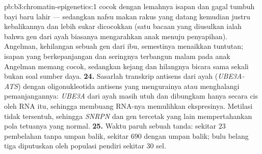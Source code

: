 \begin{solution}{pb:b3:chromatin-epigenetics:1}
cocok dengan lemahnya isapan dan gagal tumbuh bayi baru lahir --- sedangkan
nafsu makan rakus yang datang kemudian justru kebalikannya dan lebih sukar
dicocokkan (satu bacaan yang diusulkan ialah bahwa gen dari ayah biasanya
mengarahkan anak menuju penyapihan). Angelman, kehilangan sebuah gen dari
ibu, semestinya menaikkan tuntutan; isapan yang berkepanjangan dan seringnya
terbangun malam pada anak Angelman memang cocok, sedangkan kejang dan
hilangnya bicara sama sekali bukan soal sumber daya.
\textbf{24.} Sasarlah transkrip antisens dari ayah
(\emph{UBE3A-ATS}) dengan oligonukleotida antisens yang mengurainya
atau menghalangi pemanjangannya: \emph{UBE3A} dari ayah masih utuh dan
dibungkam hanya secara cis oleh RNA itu, sehingga membuang RNA-nya memulihkan
ekspresinya. Metilasi  tidak tersentuh,
sehingga \emph{SNRPN} dan gen tercetak yang lain mempertahankan pola
tetuanya yang normal.
\textbf{25.} Waktu paruh sebuah tanda: sekitar $23$ pembelahan tanpa umpan
balik, sekitar $690$ dengan umpan balik; bulu belang tiga diputuskan oleh
populasi pendiri sekitar $30$ sel.
\end{solution}
